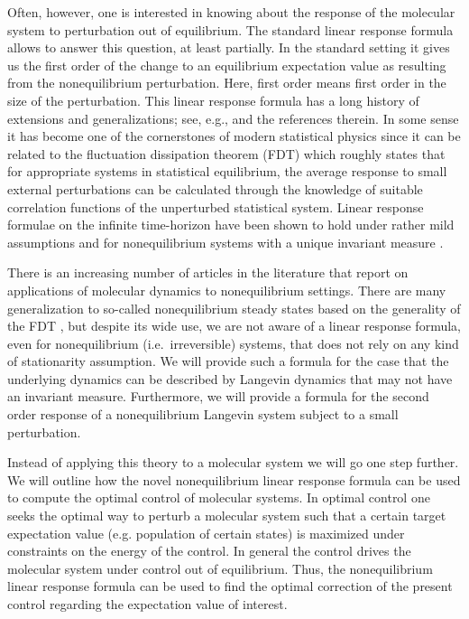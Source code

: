 \documentclass[]{tMPH2e}
\begin{document}
Often, however, one is interested in knowing about the response of the molecular system to perturbation out of equilibrium. The standard linear response formula allows to answer this question, at least partially. In the standard setting it gives us the first order of the change to an equilibrium expectation value as resulting from the nonequilibrium perturbation. Here, first order means first order in the size of the perturbation. This linear response formula has a long history of extensions and generalizations; see, e.g., \cite{marconi2008,ruelle2009} and the references therein. In some sense it has become one of the cornerstones of modern statistical physics since it can be related to the fluctuation dissipation theorem (FDT) which roughly states that for appropriate systems in statistical equilibrium, the average response to small external perturbations can be calculated through the knowledge of suitable correlation functions of the unperturbed statistical system. Linear response formulae on the infinite time-horizon have been shown to hold under rather mild assumptions and for nonequilibrium systems with a unique invariant measure \cite{hairer2008}. 

There is an increasing number of articles in the literature that report on applications of molecular dynamics to nonequilibrium settings. There are many generalization to so-called nonequilibrium steady states based on the generality of the FDT \cite{Seifert}, but despite its wide use, we are not aware of a linear response formula, even for nonequilibrium (i.e.~irreversible) systems, that does not rely on any kind of stationarity assumption. We will provide such a formula for the case that the underlying dynamics can be described by Langevin dynamics that may not have an invariant measure. Furthermore, we will provide a formula for the second order response of a nonequilibrium Langevin system subject to a small perturbation.

Instead of applying this theory to a molecular system we will go one step further. We will outline how the novel nonequilibrium linear response formula can be used to compute the optimal control of molecular systems. In optimal control one seeks the optimal way to perturb a molecular system such that a certain target expectation value (e.g. population of certain states) is maximized under constraints on the energy of the control. In general the control drives the molecular system under control out of equilibrium. Thus, the nonequilibrium linear response formula can be used to find the optimal correction of the present control regarding the expectation value of interest. 
\end{document}
